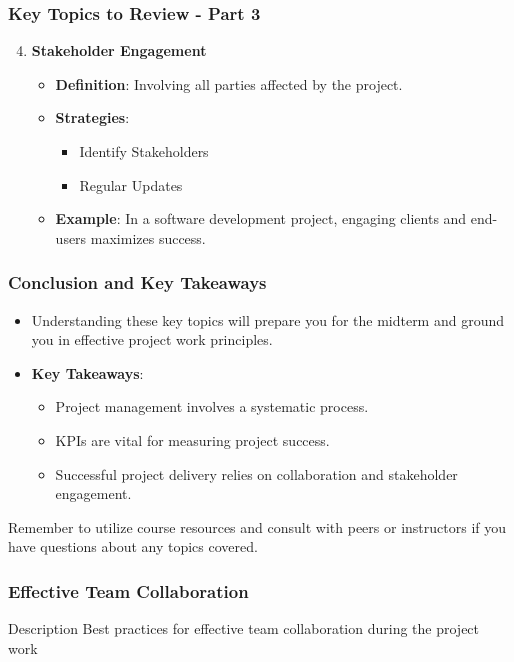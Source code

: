\documentclass[aspectratio=169]{beamer}
\begin{document}
\begin{frame}[fragile]
    \frametitle{Key Topics to Review - Part 3}
    \begin{enumerate}
        \setcounter{enumi}{3} %
        \item \textbf{Stakeholder Engagement}
            \begin{itemize}
                \item \textbf{Definition}: Involving all parties affected by the project.
                \item \textbf{Strategies}:
                    \begin{itemize}
                        \item Identify Stakeholders
                        \item Regular Updates
                    \end{itemize}
                \item \textbf{Example}: In a software development project, engaging clients and end-users maximizes success.
            \end{itemize}
    \end{enumerate}
\end{frame}

\begin{frame}[fragile]
    \frametitle{Conclusion and Key Takeaways}
    \begin{itemize}
        \item Understanding these key topics will prepare you for the midterm and ground you in effective project work principles.
        \item \textbf{Key Takeaways}:
            \begin{itemize}
                \item Project management involves a systematic process.
                \item KPIs are vital for measuring project success.
                \item Successful project delivery relies on collaboration and stakeholder engagement.
            \end{itemize}
    \end{itemize}
    Remember to utilize course resources and consult with peers or instructors if you have questions about any topics covered.
\end{frame}

\begin{frame}[fragile]
    \frametitle{Effective Team Collaboration}
    \begin{block}{Description}
        Best practices for effective team collaboration during the project work
    \end{block}
\end{frame}
\end{document}
